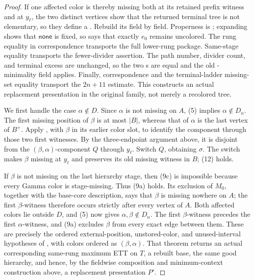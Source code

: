 \begin{proof}
If one affected color is thereby missing both at its retained prefix
witness and at \(y_\ell\), the two distinct vertices show that the
returned terminal tree is not elementary, so they define a
.  Rebuild its
 field by field.
Properness is ; expanding
 shows that \(\mathsf{none}\) is fixed,
so  says that exactly \(e_0\) remains
uncolored.  The rung equality in correspondence
transports the full lower-rung package.  Same-stage equality transports
the fewer-divider assertion.  The path number, divider count, and
terminal excess are unchanged, so the two
s are equal and the old
-minimality field applies.  Finally,
correspondence and the terminal-ladder missing-set equality transport the
\(2n+11\) estimate.  This constructs an actual replacement presentation
in the original family, not merely a recolored tree.

We first handle the case \(\alpha\notin D\).  Since \(\alpha\) is not
missing on \(A\), (5) implies \(\alpha\notin D_n\).  The first missing
position of \(\beta\) is at most \(|B|\), whereas that of \(\alpha\) is
the last vertex of \(B^+\).  Apply , with \(\beta\)
in its earlier color slot, to identify the component through those two
first witnesses.  By the three-endpoint argument above, it is disjoint
from the \((\beta,\alpha)\)-component \(Q\) through \(y_\ell\).  Switch
\(Q\), obtaining \(\sigma\).  The switch makes \(\beta\) missing at
\(y_\ell\) and preserves its old missing witness in \(B\); (12) holds.

If \(\beta\) is not missing on the last hierarchy stage, then (9c) is
impossible because every Gamma color is stage-missing.  Thus (9a) holds.
Its exclusion of \(M_0\), together with the base-core description, says
that \(\beta\) is missing nowhere on \(A\); the first \(\beta\)-witness
therefore occurs strictly after every vertex of \(A\).  Both affected
colors lie outside \(D\), and (5) now gives
\(\alpha,\beta\notin D_n\).  The first \(\beta\)-witness precedes the
first \(\alpha\)-witness, and (9a) excludes \(\beta\) from every exact
edge between them.  These are precisely the ordered external-position,
unstored-color, and unused-interval hypotheses of
, with colors ordered as
\((\beta,\alpha)\).  That theorem returns an actual corresponding
same-rung maximum ETT on \(T\), a rebuilt base, the same good hierarchy,
and hence, by the fieldwise composition and minimum-context construction
above, a replacement presentation \(P'\).


\end{proof}
